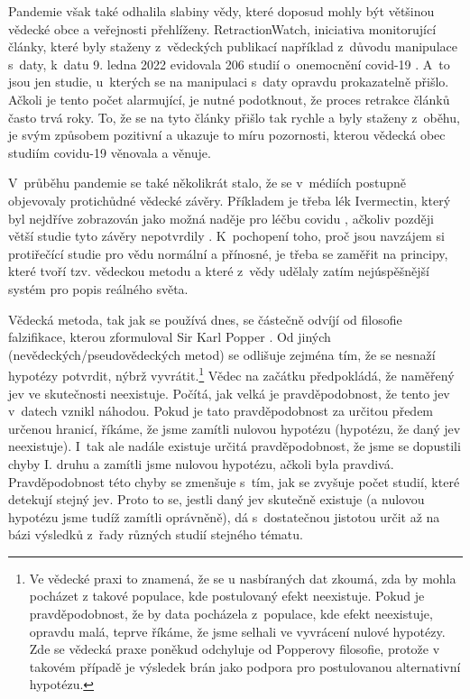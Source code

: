 Pandemie však také odhalila slabiny vědy, které doposud mohly být většinou vědecké obce a veřejnosti přehlíženy. RetractionWatch, iniciativa monitorující články, které byly staženy z~vědeckých publikací například z~důvodu manipulace s~daty, k~datu 9. ledna 2022 evidovala 206 studií o~onemocnění covid-19 \cite{RetractionWatch}. A~to jsou jen studie, u~kterých se na manipulaci s~daty opravdu prokazatelně přišlo. Ačkoli je tento počet alarmující, je nutné podotknout, že proces retrakce článků často trvá roky. To, že se na tyto články přišlo tak rychle a byly staženy z~oběhu, je svým způsobem pozitivní a ukazuje to míru pozornosti, kterou vědecká obec studiím covidu-19 věnovala a věnuje.

V~průběhu pandemie se také několikrát stalo, že se v~médiích postupně objevovaly protichůdné vědecké závěry. Příkladem je třeba lék Ivermectin, který byl nejdříve zobrazován jako možná naděje pro léčbu covidu \cite{Ceskatelevize2020}, ačkoliv později větší studie tyto závěry nepotvrdily \cite{Lopez-Medina2021}. K~pochopení toho, proč jsou navzájem si protiřečící studie pro vědu normální a přínosné, je třeba se zaměřit na principy, které tvoří tzv. vědeckou metodu a které z~vědy udělaly zatím nejúspěšnější systém pro popis reálného světa.

Vědecká metoda, tak jak se používá dnes, se částečně odvíjí od filosofie falzifikace, kterou zformuloval Sir Karl Popper \cite{Popper2002}. Od jiných (ne\-vě\-de\-ckých/pseu\-do\-vě\-de\-ckých metod) se odlišuje zejména tím, že se nesnaží hypotézy potvrdit, nýbrž vyvrátit.\footnote{Ve vědecké praxi to znamená, že se u nasbíraných dat zkoumá, zda by mohla pocházet z takové populace, kde postulovaný efekt neexistuje. Pokud je pravděpodobnost, že by data pocházela z~populace, kde efekt neexistuje, opravdu malá, teprve říkáme, že jsme selhali ve vyvrácení nulové hypotézy. Zde se vědecká praxe poněkud odchyluje od Popperovy filosofie, protože v takovém případě je výsledek brán jako podpora pro postulovanou alternativní hypotézu.} Vědec na začátku předpokládá, že naměřený jev ve skutečnosti neexistuje. Počítá, jak velká je pravděpodobnost, že tento jev v~datech vznikl náhodou. Pokud je tato pravděpodobnost za určitou předem určenou hranicí, říkáme, že jsme zamítli nulovou hypotézu (hypotézu, že daný jev neexistuje). I~tak ale nadále existuje určitá pravděpodobnost, že jsme se dopustili chyby I. druhu a zamítli jsme nulovou hypotézu, ačkoli byla pravdivá. Pravděpodobnost této chyby se zmenšuje s~tím, jak se zvyšuje počet studií, které detekují stejný jev. Proto to se, jestli daný jev skutečně existuje (a nulovou hypotézu jsme tudíž zamítli oprávněně), dá s~dostatečnou jistotou určit až na bázi výsledků z~řady různých studií stejného tématu.


